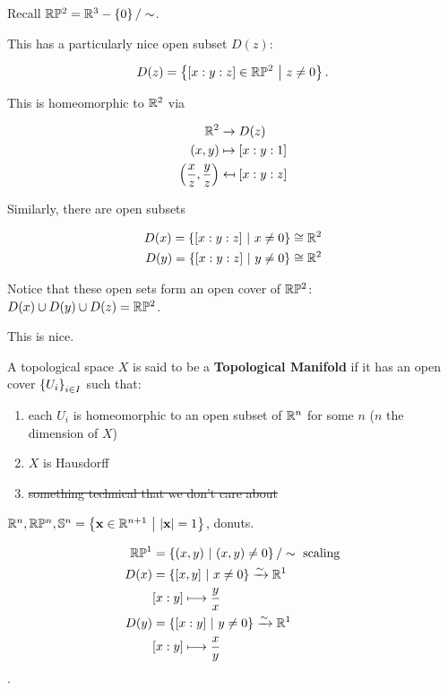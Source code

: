 \documentclass[12pt, twosided]{article}
\begin{document}
\begin{exa}
  Recall \(\mathbb{R}\mathbb{P}^2 = \mathbb{R}^3 - \left\{ 0 \right\} / \sim\).

  This has a particularly nice open subset \(D(z)\):

  \begin{align*}
    D(z) = \left\{ [x : y : z] \in \mathbb{R}\mathbb{P}^2 \ \middle\vert\  z \neq 0 \right\}.
  \end{align*}

  This is homeomorphic to \(\mathbb{R}^2\) via

  \begin{align*}
    \mathbb{R}^2 &\to D(z) \\
    (x, y) &\mapsto [x: y : 1] \\
    \left(\frac{x}{z}, \frac{y}{z}\right) &\mapsfrom [x: y: z]
  \end{align*}

  Similarly, there are open subsets

  \begin{align*}
    D(x) = \left\{ [x: y: z] \ \middle\vert\  x \neq 0 \right\} \cong \mathbb{R}^2 \\
    D(y) = \left\{ [x: y: z] \ \middle\vert\  y \neq 0 \right\} \cong \mathbb{R}^2 \\
  \end{align*}

  Notice that these open sets form an open cover of \(\mathbb{R}\mathbb{P}^2\): \(D(x) \cup D(y) \cup D(z) = \mathbb{R}\mathbb{P}^2\).

  This is nice.
\end{exa}

\begin{df}
  A topological space \(X\) is said to be a \textbf{Topological Manifold} if it has an open cover \(\left\{ U_i \right\}_{i \in I}\) such that:
  \begin{enumerate}
  \item each \(U_i\) is homeomorphic to an open subset of \(\mathbb{R}^n\) for some \(n\) (\(n\) the dimension of \(X\))
  \item \(X\) is Hausdorff 
  \item \sout{something technical that we don't care about}
  \end{enumerate}
\end{df}

\begin{exa}
  \(\mathbb{R}^n, \mathbb{R}\mathbb{P}^n, \mathbb{S}^n = \left\{ \mathbf{x} \in \mathbb{R}^{n+1} \ \middle\vert\  |\mathbf{x} | = 1 \right\}\), donuts.
\end{exa}


\begin{exa}
  \begin{align*}
    \mathbb{R}\mathbb{P}^1 &= \left\{ (x, y) \ \middle\vert\  (x, y) \neq 0 \right\} / \sim \text{ scaling} \\
    D(x) &= \left\{ [x, y] \ \middle\vert\  x \neq 0 \right\} \xrightarrow{\sim} \mathbb{R}^1 \\
           & [x:y] \longmapsto \frac{y}{x} \\
    D(y) &= \left\{ [x:y] \ \middle\vert\  y \neq 0 \right\} \xrightarrow{\sim} \mathbb{R}^1 \\
           & [x:y] \longmapsto \frac{x}{y}
  \end{align*}
  .
\end{exa}
\end{document}
